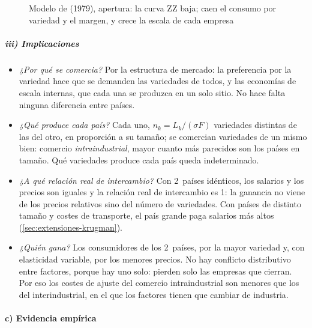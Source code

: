 \documentclass[11pt]{article}
\begin{document}
\begin{figure}[H]
\centering
\caption{Modelo de  (1979), apertura: la curva ZZ baja; caen el consumo por variedad y el margen, y crece la escala de cada empresa}\label{fig:krugman-ppzz}
\end{figure}


\subparagraph{iii) Implicaciones}

\begin{itemize}
\item \emph{¿Por qué se comercia?} Por la estructura de mercado: la preferencia por la variedad hace que se demanden las variedades de todos, y las economías de escala internas, que cada una se produzca en un solo sitio. No hace falta ninguna diferencia entre países.
\item \emph{¿Qué produce cada país?} Cada uno, $n_k=L_k/(\sigma F)$ variedades distintas de las del otro, en proporción a su tamaño; se comercian variedades de un mismo bien: comercio \emph{intraindustrial}, mayor cuanto más parecidos son los países en tamaño. Qué variedades produce cada país queda indeterminado.
\item \emph{¿A qué relación real de intercambio?} Con 2~países idénticos, los salarios y los precios son iguales y la relación real de intercambio es 1: la ganancia no viene de los precios relativos sino del número de variedades. Con países de distinto tamaño y costes de transporte\nocite{Krugman1980Scale}, el país grande paga salarios más altos (\ref{sec:extensiones-krugman}).
\item \emph{¿Quién gana?} Los consumidores de los 2~países, por la mayor variedad y, con elasticidad variable, por los menores precios. No hay conflicto distributivo entre factores, porque hay uno solo: pierden solo las empresas que cierran. Por eso los costes de ajuste del comercio intraindustrial son menores que los del interindustrial, en el que los factores tienen que cambiar de industria.
\end{itemize}

\paragraph{c) Evidencia empírica}
\end{document}
